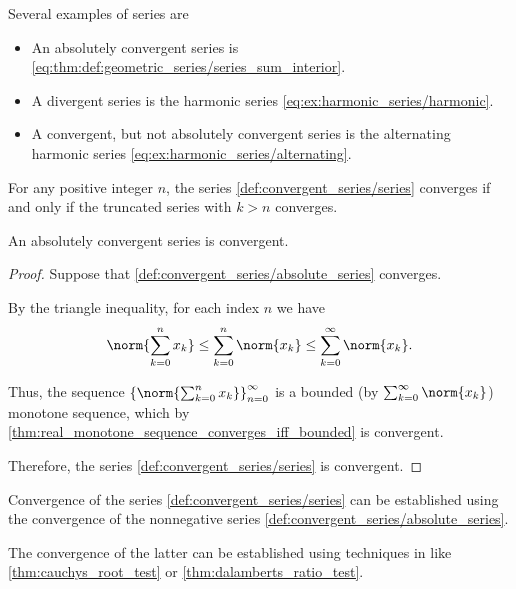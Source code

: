 \begin{example}\label{ex:series}
  Several examples of series are
  \begin{itemize}
    \item An absolutely convergent series is \eqref{eq:thm:def:geometric_series/series_sum_interior}.
    \item A divergent series is the harmonic series \eqref{eq:ex:harmonic_series/harmonic}.
    \item A convergent, but not absolutely convergent series is the alternating harmonic series \eqref{eq:ex:harmonic_series/alternating}.
  \end{itemize}
\end{example}

\begin{proposition}\label{thm:truncated_series_convergence}
  For any positive integer \( n \), the series \eqref{def:convergent_series/series} converges if and only if the truncated series with \( k > n \) converges.
\end{proposition}

\begin{proposition}\label{thm:absolutely_convergent_series_is_convergent}
  An absolutely convergent series is convergent.
\end{proposition}
\begin{proof}
  Suppose that \eqref{def:convergent_series/absolute_series} converges.

  By the triangle inequality, for each index \( n \) we have
  \begin{equation*}
    \norm{\sum_{k=0}^n x_k} \leq \sum_{k=0}^n \norm{x_k} \leq \sum_{k=0}^\infty \norm{x_k}.
  \end{equation*}

  Thus, the sequence \( \left\{ \norm{\sum_{k=0}^{n} x_k} \right\}_{n=0}^\infty \) is a bounded (by \( \sum_{k=0}^\infty \norm{x_k} \)) monotone sequence, which by \cref{thm:real_monotone_sequence_converges_iff_bounded} is convergent.

  Therefore, the series \eqref{def:convergent_series/series} is convergent.
\end{proof}

\begin{remark}\label{rem:establish_series_convergence_by_absolute_series}
  Convergence of the series \eqref{def:convergent_series/series} can be established using the convergence of the nonnegative series \eqref{def:convergent_series/absolute_series}.

  The convergence of the latter can be established using techniques in  like \cref{thm:cauchys_root_test} or \cref{thm:dalamberts_ratio_test}.
\end{remark}


